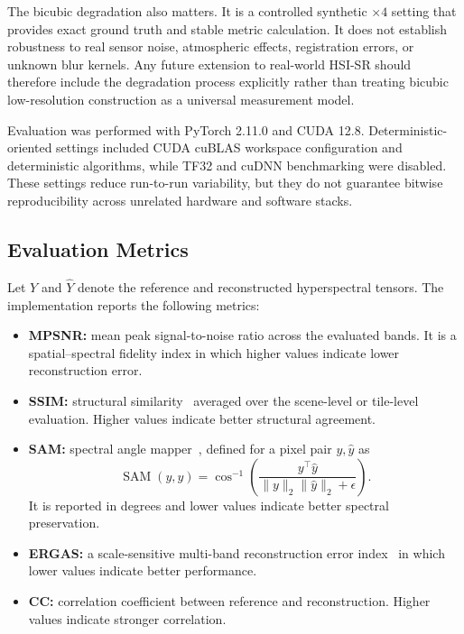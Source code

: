 \documentclass[10pt,twocolumn,letterpaper]{article}
\begin{document}
The bicubic degradation also matters. It is a controlled synthetic $\times4$ setting that provides exact ground truth and stable metric calculation. It does not establish robustness to real sensor noise, atmospheric effects, registration errors, or unknown blur kernels. Any future extension to real-world HSI-SR should therefore include the degradation process explicitly rather than treating bicubic low-resolution construction as a universal measurement model.

Evaluation was performed with PyTorch 2.11.0 and CUDA 12.8. Deterministic-oriented settings included CUDA cuBLAS workspace configuration and deterministic algorithms, while TF32 and cuDNN benchmarking were disabled. These settings reduce run-to-run variability, but they do not guarantee bitwise reproducibility across unrelated hardware and software stacks.

\subsection{Evaluation Metrics}

Let $Y$ and $\hat{Y}$ denote the reference and reconstructed hyperspectral tensors. The implementation reports the following metrics:

\begin{itemize}
    \item \textbf{MPSNR:} mean peak signal-to-noise ratio across the evaluated bands. It is a spatial--spectral fidelity index in which higher values indicate lower reconstruction error.
    \item \textbf{SSIM:} structural similarity~\cite{wang2004ssim} averaged over the scene-level or tile-level evaluation. Higher values indicate better structural agreement.
    \item \textbf{SAM:} spectral angle mapper~\cite{yuhas1992sam}, defined for a pixel pair $y,\hat{y}$ as
    \begin{equation}
        \operatorname{SAM}(y,\hat{y}) = \cos^{-1}\left(
        \frac{y^{\top}\hat{y}}{\|y\|_2\|\hat{y}\|_2+\epsilon}
        \right).
    \end{equation}
    It is reported in degrees and lower values indicate better spectral preservation.
    \item \textbf{ERGAS:} a scale-sensitive multi-band reconstruction error index~\cite{wald2002ergas} in which lower values indicate better performance.
    \item \textbf{CC:} correlation coefficient between reference and reconstruction. Higher values indicate stronger correlation.
\end{itemize}
\end{document}
